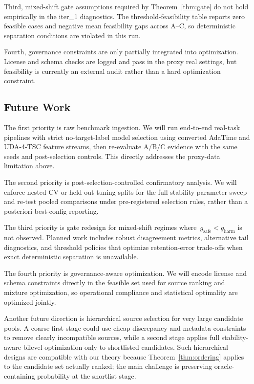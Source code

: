 \documentclass{article} %
\begin{document}
Third, mixed-shift gate assumptions required by Theorem~\ref{thm:gate} do not hold empirically in the iter\_1 diagnostics. The threshold-feasibility table reports zero feasible cases and negative mean feasibility gaps across A--C, so deterministic separation conditions are violated in this run.

Fourth, governance constraints are only partially integrated into optimization. License and schema checks are logged and pass in the proxy real settings, but feasibility is currently an external audit rather than a hard optimization constraint.

\subsection{Future Work}
The first priority is raw benchmark ingestion. We will run end-to-end real-task pipelines with strict no-target-label model selection using converted AdaTime and UDA-4-TSC feature streams, then re-evaluate A/B/C evidence with the same seeds and post-selection controls. This directly addresses the proxy-data limitation above.

The second priority is post-selection-controlled confirmatory analysis. We will enforce nested-CV or held-out tuning splits for the full stability-parameter sweep and re-test pooled comparisons under pre-registered selection rules, rather than a posteriori best-config reporting.

The third priority is gate redesign for mixed-shift regimes where \(\,g_{\mathrm{safe}}<g_{\mathrm{harm}}\) is not observed. Planned work includes robust disagreement metrics, alternative tail diagnostics, and threshold policies that optimize retention-error trade-offs when exact deterministic separation is unavailable.

The fourth priority is governance-aware optimization. We will encode license and schema constraints directly in the feasible set used for source ranking and mixture optimization, so operational compliance and statistical optimality are optimized jointly.

Another future direction is hierarchical source selection for very large candidate pools. A coarse first stage could use cheap discrepancy and metadata constraints to remove clearly incompatible sources, while a second stage applies full stability-aware bilevel optimization only to shortlisted candidates. Such hierarchical designs are compatible with our theory because Theorem~\ref{thm:ordering} applies to the candidate set actually ranked; the main challenge is preserving oracle-containing probability at the shortlist stage.
\end{document}
